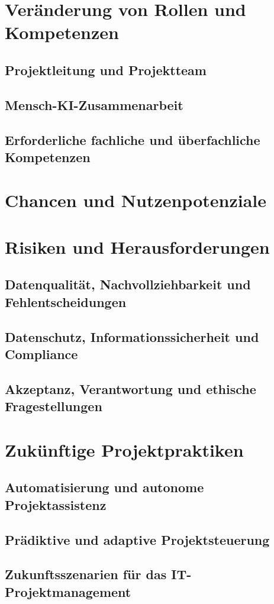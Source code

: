 \section{Veränderung von Rollen und Kompetenzen}
\label{sec:RollenUndKompetenzen}

\subsection{Projektleitung und Projektteam}
\subsection{Mensch-KI-Zusammenarbeit}
\subsection{Erforderliche fachliche und überfachliche Kompetenzen}

\section{Chancen und Nutzenpotenziale}
\label{sec:KIChancen}

\section{Risiken und Herausforderungen}
\label{sec:KIRisiken}

\subsection{Datenqualität, Nachvollziehbarkeit und Fehlentscheidungen}
\subsection{Datenschutz, Informationssicherheit und Compliance}
\subsection{Akzeptanz, Verantwortung und ethische Fragestellungen}

\section{Zukünftige Projektpraktiken}
\label{sec:ZukuenftigeProjektpraktiken}

\subsection{Automatisierung und autonome Projektassistenz}
\subsection{Prädiktive und adaptive Projektsteuerung}
\subsection{Zukunftsszenarien für das IT-Projektmanagement}
